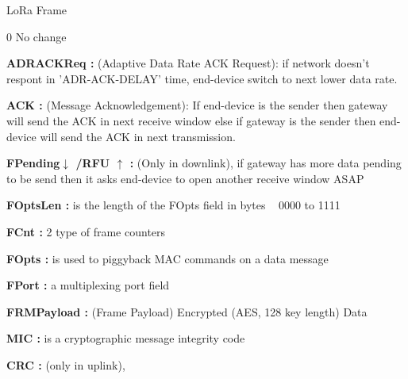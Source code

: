 \begin{frame}{LoRa Frame}{}
\begin{multicols}{2}
{{    \item 0  No change
  }
  \item \textbf{ADRACKReq :} (Adaptive Data Rate ACK Request): if network doesn't respont in 'ADR-ACK-DELAY' time, end-device switch to next lower data rate.
  \item \textbf{ACK :} (Message Acknowledgement): If end-device is the sender then gateway will send the ACK in next receive window  else if gateway is the sender then end-device will send the ACK in next transmission.
  \item \textbf{FPending$\downarrow$ /RFU $\uparrow$ :} (Only in downlink), if gateway has more data pending to be send then it asks end-device to open another receive window ASAP
  \item \textbf{FOptsLen :} is the length of the FOpts field in bytes   0000 to 1111 
  \item \textbf{FCnt :}  2 type of frame counters 
  \item \textbf{FOpts :} is used to piggyback MAC commands on a data message  
  \item \textbf{FPort :}  a multiplexing port field
    \item \textbf{FRMPayload :} (Frame Payload)  Encrypted (AES, 128 key length) Data                                 
  \item \textbf{MIC :}  is a cryptographic message integrity code
  \item \textbf{CRC :} (only in uplink), 
}

\end{multicols}
 \end{frame}




